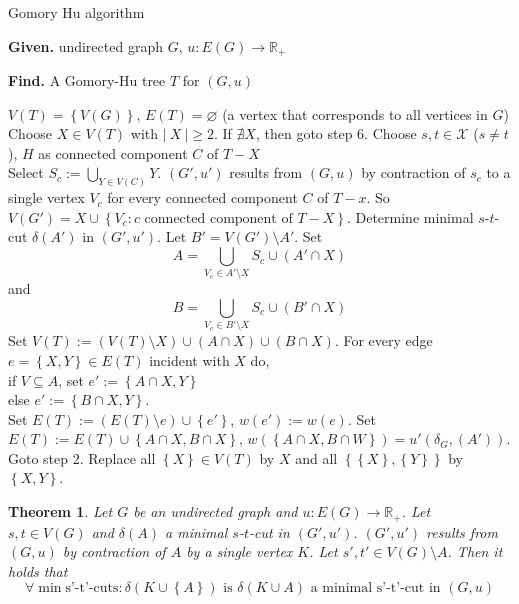 \documentclass{article}
\newtheorem{theorem}{Theorem}
\newcommand{\card}[1]{\left|\:\!#1\:\!\right|}
\newcommand{\set}[1]{\left\{#1\right\}}
\newcommand{\given}[1]{\textbf{Given.} #1\par}
\newcommand{\find}[1]{\textbf{Find.} #1\par}
\begin{document}
\begin{algorithm}
  \caption{Gomory Hu algorithm}
  \label{gomory-hu-algo}
  \given{undirected graph $G$, $u: E(G) \rightarrow \mathbb{R}_+$}
  \find{A Gomory-Hu tree $T$ for $(G, u)$}
\begin{algorithmic}[1]
  \State $V(T) = \set{V(G)}$, $E(T) = \diameter$ (a vertex that corresponds to all vertices in $G$)
  \State Choose $X \in V(T)$ with $\card{X} \geq 2$. If $\nexists X$, then goto step 6.
  \State Choose $s,t \in \mathcal{X}$ ($s \neq t$), $H$ as connected component $C$ of $T-X$ \\
         Select $S_c := \bigcup_{Y \in V(C)} Y$. $(G', u')$ results from $(G, u)$ by contraction of $s_c$ to a single vertex $V_c$ for every connected component $C$ of $T-x$. So $V(G') = X \cup \set{V_c: c \text{ connected component of } T-X}$.
  \State Determine minimal $s$-$t$-cut $\delta(A')$ in $(G', u')$. Let $B' = V(G') \setminus A'$.
         Set \[
          A = \bigcup_{V_c \in A' \setminus X} S_c \cup (A' \cap X)
         \] and \[
          B = \bigcup_{V_c \in B' \setminus X} S_c \cup (B' \cap X)
         \]
  \State Set $V(T) := (V(T) \setminus X) \cup (A \cap X) \cup (B \cap X)$.
         For every edge $e = \set{X, Y} \in E(T)$ incident with $X$ do, \\
           \hspace{20pt} if $V \subseteq A$, set $e' := \set{A \cap X, Y}$ \\
           \hspace{20pt} else $e' := \set{B \cap X, Y}$. \\
         Set $E(T) := (E(T) \setminus e) \cup \set{e'}$, $w(e') := w(e)$.
         Set $E(T) := E(T) \cup \set{A \cap X, B \cap X}$, $w(\set{A \cap X, B \cap W}) = u'(\delta_G, (A'))$.
         Goto step 2.
  \State Replace all $\set{X} \in V(T)$ by $X$ and all $\set{\set{X}, \set{Y}}$ by $\set{X, Y}$.
\end{algorithmic}
\end{algorithm}

\begin{theorem}\label{lemma-4.16}
  Let $G$ be an undirected graph and $u: E(G) \rightarrow \mathbb{R}_+$.
  Let $s, t \in V(G)$ and $\delta(A)$ a minimal $s$-$t$-cut in $(G', u')$.
  $(G', u')$ results from $(G, u)$ by contraction of $A$ by a single vertex $K$.
  Let $s', t' \in V(G) \setminus A$. Then it holds that
  \[
    \forall \min{\text{s'-t'-cuts}}: \delta(K \cup \set{A}) \text{ is }
      \delta(K \cup A) \text{ a minimal s'-t'-cut in } (G, u)
  \]
\end{theorem}
\end{document}
